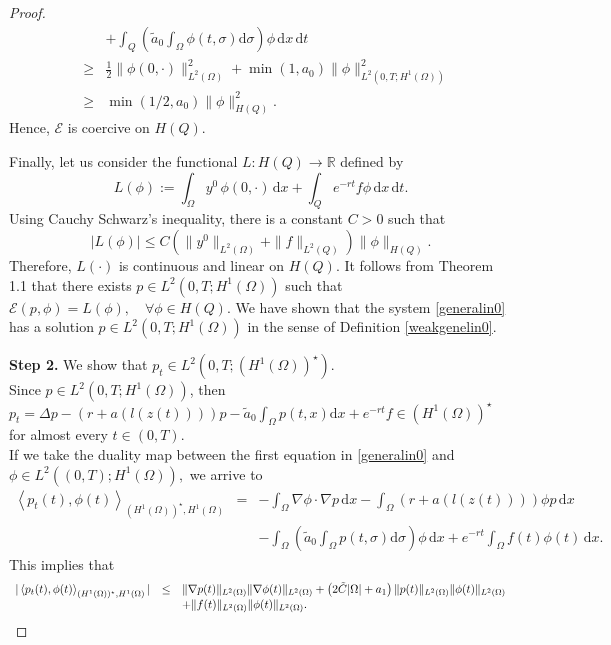 \documentclass[reqno,twoside]{amsart}
\numberwithin{equation}{section}
\theoremstyle{definition}
\numberwithin{equation}{section}
\def \dis {\displaystyle}
\def \R {\mathbb{R}}
\def \dx{\mathrm{d}x}
\def \dq {\mathrm{d}x \, \mathrm{d}t}
\def \d {\mathrm{d}}
\def \R {\mathbb{R}}
\begin{document}
\begin{proof}
$$\begin{array}{rlll}
	&&+\dis \int_Q\left(\tilde{a}_0 \dis \int_{\Omega}\phi(t,\sigma)\d\sigma\right)\phi\, \dq\\
	&\geq& \dis \frac 12  \|\phi(0,\cdot)\|^2_{L^2(\Omega)}+ \min (1,a_0)\|\phi\|^2_{L^2(0,T;H^1(\Omega))}\\
	&\geq&\min (1/2,a_0) \|\phi\|^2_{H(Q)}.
\end{array}
$$
Hence, $\mathcal E$ is coercive on $H(Q)$.\par
Finally, let us consider the functional $L:H(Q)\to \R$ defined by
$$
L(\phi):=\dis \int_\Omega y^0\,\phi(0,\cdot)\, \dx+\int_{Q}e^{-rt}f\phi\,\dq.
$$
Using Cauchy Schwarz's inequality,  there is a constant $C>0$ such that
$$
|L(\phi)|
\leq  C\left( \|y^0\|_{L^2(\Omega)}+\|f\|_{L^2(Q)}\right)\|\phi\|_{H(Q)}.
$$
Therefore,  $L(\cdot)$ is continuous and linear on $H(Q)$. It follows from Theorem 1.1 \cite[Page 37]{lions2013} that there exists $p\in L^2(0,T;H^1(\Omega))$ such that
$\mathcal{E}(p,\phi)= L(\phi),\quad \forall \phi \in H(Q)$.
We have shown that the system \eqref{generalin0} has a solution $p\in L^2(0,T;H^1(\Omega))$ in the sense of Definition \ref{weakgenelin0}.\par	
\noindent\textbf{Step 2.} We show that $p_t\in L^2(0,T;(H^1(\Omega))^\star)$.\\
Since $p\in L^2(0,T;H^1(\Omega))$,  then
$\dis p_t=\Delta p-(r+a(l(z(t))))p-\tilde{a}_0\int_{\Omega}p(t,x)\dx+e^{-rt}f\in (H^1(\Omega))^\star$ for almost every $t\in (0,T)$. \\
If we take the duality map between the first equation in   \eqref{generalin0} and $\phi\in L^2((0,T);H^1(\Omega)),$
we arrive to
$$\begin{array}{rlll}
	\dis  \left\langle p_t(t),\phi(t)\right\rangle_{(H^1(\Omega))^\star,H^1(\Omega)}&=&\dis - \int_\Omega \nabla \phi\cdot\nabla p\, \dx-\int_\Omega( r+a\left(l(z(t))\right)) \phi p\, \dx\\
	&&-\dis \int_\Omega\left(\tilde{a}_0 \dis \int_{\Omega}p(t,\sigma)\d\sigma\right)\phi\, \dx+e^{-rt} \int_\Omega f(t)\phi(t)\,\dx.
\end{array}
$$
This implies that
$$
\begin{array}{llll}
	\dis |\left\langle p_t(t),\phi(t)\right\rangle_{(H^1(\Omega))^\star,H^1(\Omega)}| &\leq& \dis \dis \|\nabla p(t)\|_{L^2(\Omega)} \|\nabla \phi(t)\|_{L^2(\Omega)} + \left(2\tilde{C}|\Omega|+a_1\right)\|p(t)\|_{L^2(\Omega)}\|\phi(t)\|_{L^2(\Omega)}\\
	&&+\|f(t)\|_{L^2(\Omega)}\|\phi(t)\|_{L^2(\Omega)}
	.
\end{array}
$$
\end{proof}
\end{document}

